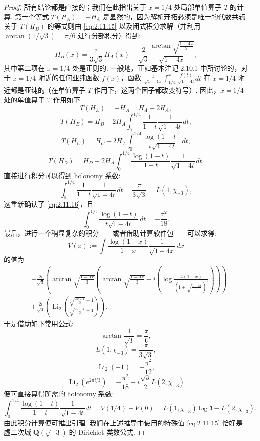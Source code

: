 \begin{proof}
所有结论都是直接的；我们在此指出关于 $x=1/4$ 处局部单值算子 $T$ 的计算. 第一个等式 $T(H_A)=-H_A$ 是显然的，因为解析开拓必须是唯一的代数共轭. 关于 $T(H_B)$ 的等式则由 \eqref{eq:2.11.15} 以及闭式积分求解（并利用 $\arctan(1/\sqrt{3})=\pi/6$ 进行分部积分）得到:
\begin{equation}\label{eq:2.11.16}
H_B(x) = \frac{\pi}{3\sqrt{3}} H_A(x) - \frac{2}{\sqrt{3}} \frac{\arctan\sqrt{\frac{1-4x}{3}}}{\sqrt{1-4x}},
\end{equation}
其中第二项在 $x=1/4$ 处是正则的. 一般地，正如基本注记 2.10.1 中所讨论的，对于 $x=1/4$ 附近的任何亚纯函数 $f(x)$，函数 $\frac{1}{\sqrt{1-4x}} \int_{1/4}^x \frac{f(t)}{\sqrt{1-4t}} dt$ 在 $x=1/4$ 附近都是亚纯的（在单值算子 $T$ 作用下，这两个因子都改变符号）. 因此，$x=1/4$ 处的单值算子 $T$ 作用如下:
\[ T(H_A) = -H_A = H_A - 2H_A, \]
\[ T(H_B) = H_B - 2H_A \int_0^{1/4} \frac{1}{1 - t} \frac{1}{\sqrt{1 - 4t}} dt, \]
\[ T(H_C) = H_C - 2H_A \int_0^{1/4} \frac{\log(1 - t)}{t\sqrt{1 - 4t}} dt, \]
\[ T(H_D) = H_D - 2H_A \int_0^{1/4} \frac{\log(1 - t)}{1 - t} \frac{1}{\sqrt{1 - 4t}} dt. \]
直接进行积分可以得到 holonomy 系数:
\[ \int_0^{1/4} \frac{1}{1-t} \frac{1}{\sqrt{1-4t}} dt = \frac{\pi}{3\sqrt{3}} = L(1, \chi_{-3}), \]
这重新确认了 \eqref{eq:2.11.16}，且
\[ \int_0^{1/4} \frac{\log(1-t)}{t\sqrt{1-4t}} \, dt = -\frac{\pi^2}{18}. \]
最后，进行一个稍显复杂的积分——或者借助计算软件包——可以求得:
\[ V(x) := \int \frac{\log(1-x)}{1-x} \frac{1}{\sqrt{1-4x}} \, dx \]
的值为
\[
\begin{aligned}
& -\frac{2i}{\sqrt{3}} \left( \arctan \sqrt{\frac{1-4x}{3}} \left( \arctan \sqrt{\frac{1-4x}{3}} - i \left( \log \frac{4(1-x)}{\left(1+\sqrt{\frac{1-4x}{3}}\right)^2} \right) \right) \right) \\
& +\frac{2i}{\sqrt{3}} \left( \operatorname{Li}_2 \left( \frac{\sqrt{\frac{4x-1}{3}} - 1}{\sqrt{\frac{4x-1}{3}} + 1} \right) \right),
\end{aligned}
\]
于是借助如下常用公式:
\[ \arctan \frac{1}{\sqrt{3}} = \frac{\pi}{6}, \]
\[ L(1, \chi_{-3}) = \frac{\pi}{3\sqrt{3}}, \]
\[ \operatorname{Li}_2(-1) = -\frac{\pi^2}{12}, \]
\[ \operatorname{Li}_2\left(e^{2\pi i/3}\right) = -\frac{\pi^2}{18} + i\frac{\sqrt{3}}{2}L(2, \chi_{-3}) \]
便可直接算得所需的 holonomy 系数:
\[ \int_0^{1/4} \frac{\log(1-t)}{1-t} \frac{1}{\sqrt{1-4t}} dt = V(1/4) - V(0) = L(1,\chi_{-3}) \log 3 - L(2,\chi_{-3}). \]
由此积分计算便可推出引理. 我们在上述推导中使用的特殊值 \eqref{eq:2.11.15} 恰好是虚二次域 $\mathbf{Q}(\sqrt{-3})$ 的 Dirichlet 类数公式.
\end{proof}

